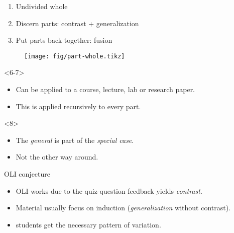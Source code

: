 \begin{frame}
  \begin{example}
    \begin{enumerate}
      \item \alert<1>{Undivided whole}
      \item \alert<2>{Discern parts}: \alert<3>{contrast} + 
        \alert<4>{generalization}
      \item Put parts back together: \alert<5>{fusion}
    \end{enumerate}
  \end{example}

  \begin{figure}
    \texttt{[image: fig/part-whole.tikz]}
  \end{figure}

  \begin{onlyenv}<6-7>
    \begin{remark}
      \begin{itemize}
        \item<6> Can be applied to a course, lecture, lab or research paper.
        \item<7> This is applied recursively to every part.
      \end{itemize}
    \end{remark}
  \end{onlyenv}

  \begin{onlyenv}<8>
    \begin{remark}[An implication]
      \begin{itemize}
        \item The \emph{general} is part of the \emph{special case}.
        \item Not the other way around.
      \end{itemize}
    \end{remark}
  \end{onlyenv}
\end{frame}

\begin{frame}
  \begin{alertblock}{OLI conjecture}
    \begin{itemize}
      \item OLI works due to the quiz-question feedback yields \emph{contrast}.
      \item Material usually focus on induction (\emph{generalization} without 
        contrast).
      \item \Ie students get the necessary pattern of variation.
    \end{itemize}
  \end{alertblock}
\end{frame}

